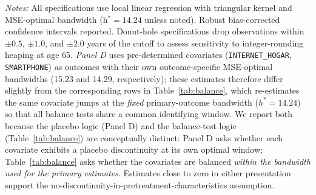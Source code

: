 \begin{threeparttable}
\begin{tablenotes}
\item \textit{Notes:} All specifications use local linear regression with triangular kernel and MSE-optimal bandwidth (h$^{\ast}\!=\!14.24$ unless noted). Robust bias-corrected confidence intervals reported. Donut-hole specifications drop observations within $\pm 0.5$, $\pm 1.0$, and $\pm 2.0$ years of the cutoff to assess sensitivity to integer-rounding heaping at age 65. \textit{Panel D} uses pre-determined covariates (\texttt{INTERNET\_HOGAR}, \texttt{SMARTPHONE}) as outcomes with their own outcome-specific MSE-optimal bandwidths (15.23 and 14.29, respectively); these estimates therefore differ slightly from the corresponding rows in Table~\ref{tab:balance}, which re-estimates the same covariate jumps at the \emph{fixed} primary-outcome bandwidth ($h^{\ast}\!=\!14.24$) so that all balance tests share a common identifying window. We report both because the placebo logic (Panel D) and the balance-test logic (Table~\ref{tab:balance}) are conceptually distinct: Panel D asks whether each covariate exhibits a placebo discontinuity at its own optimal window; Table~\ref{tab:balance} asks whether the covariates are balanced \emph{within the bandwidth used for the primary estimates}. Estimates close to zero in either presentation support the no-discontinuity-in-pretreatment-characteristics assumption.
\end{tablenotes}
\end{threeparttable}